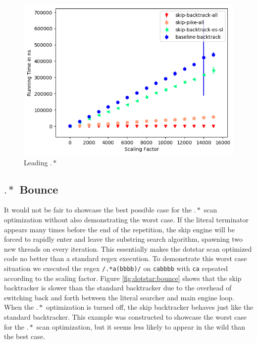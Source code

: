 \begin{figure}
\caption{Leading $.*$}
\label{fig:leading:dotstar}

\includegraphics{resources/leading-dotstar.png}
\end{figure}

\subsection{$.*$ Bounce}

It would not be fair to showcase the best possible case for the
$.*$ scan optimization without also demonstrating the worst
case. If the literal terminator appears many times before the
end of the repetition, the skip engine will be forced to
rapidly enter and leave the substring search algorithm, spawning
two new threads on every iteration. This essentially makes
the dotstar scan optimized code no better than a standard regex
execution. To demonstrate this worst case situation we executed
the regex \verb'/.*a(bbbb)/' on \verb'cabbbb' with \verb'ca'
repeated according to the scaling factor. Figure \ref{fig:dotstar:bounce}
shows that the skip backtracker is slower than the standard
backtracker due to the overhead of switching back and forth between the
literal searcher and main engine loop. When the $.*$ optimization is
turned off, the skip backtracker behaves just like the standard
backtracker. This example was constructed to showcase the worst
case for the $.*$ scan optimization, but it seems less likely to appear
in the wild than the best case.

